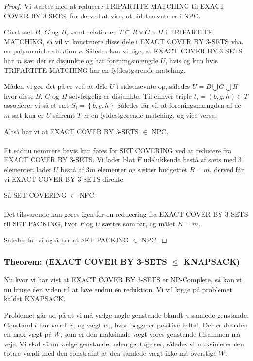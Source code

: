 \begin{proof}
Vi starter med at reducere TRIPARTITE MATCHING til EXACT COVER BY 3-SETS, for
derved at vise, at sidstnævnte er i NPC.

Givet sæt $B$, $G$ og $H$, samt relationen $T \subseteq B \times G \times H$ i
TRIPARTITE MATCHING, så vil vi konstruere disse dele i EXACT COVER BY 3-SETS
vha. en polynomiel reduktion $r$. Således kan vi sige, at EXACT COVER BY
3-SETS har $m$ sæt der er disjunkte og har foreningsmængde $U$, hvis og kun
hvis TRIPARTITE MATCHING har en fyldestgørende matching.

Måden vi gør det på er ved at dele $U$ i sidstnævnte op, således $U = B
\bigcup G \bigcup H$ hvor disse $B$, $G$ og $H$ selvfølgelig er disjunkte. Til
enhver triple $t_i=(b,g,h) \in T$ associerer vi så et sæt $S_i=\left\lbrace
b,g,h \right\rbrace$ Således får vi, at foreningsmængden af de $m$ sæt kun er
$U$ såfremt $T$ er en fyldestgørende matching, og vice-versa.

Altså har vi at EXACT COVER BY 3-SETS $\in$ NPC.\\
~\\
Et endnu nemmere bevis kan føres for SET COVERING ved at reducere fra EXACT
COVER BY 3-SETS. Vi lader blot $F$ udelukkende bestå af sæts med 3 elementer,
lader $U$ bestå af $3m$ elementer og sætter budgettet $B=m$, derved får vi
EXACT COVER BY 3-SETS direkte. 

Så SET COVERING $\in$ NPC.\\
~\\
Det tilsvarende kan gøres igen for en reducering fra EXACT COVER BY 3-SETS til
SET PACKING, hvor $F$ og $U$ sættes som før, og målet $K=m$. 

Således får vi også her at SET PACKING $\in$ NPC.
\end{proof}

\subsubsection{Theorem: (EXACT COVER BY 3-SETS $\leq$ KNAPSACK)}

Nu hvor vi har vist at EXACT COVER BY 3-SETS er NP-Complete, så kan vi nu bruge
den viden til at lave endnu en reduktion. Vi vil kigge på problemet kaldet
KNAPSACK.

Problemet går ud på at vi må vælge nogle genstande blandt $n$ samlede
genstande. Genstand $i$ har værdi $v_i$ og vægt $w_i$, hvor begge er positive
heltal. Der er desuden en max vægt på $W$, som er den maksimale vægt vores
genstande tilsammen må veje. Vi skal så nu vælge genstande, uden gentagelser,
således vi maksimerer den totale værdi med den constraint at den samlede vægt
ikke må overstige $W$.

